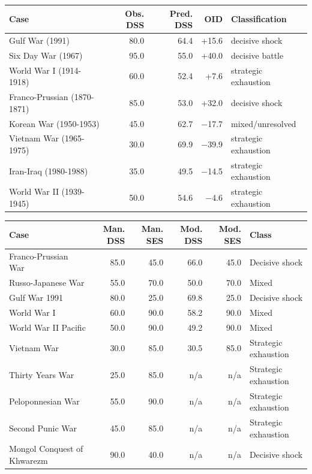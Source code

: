 \begin{table}[p]
\centering
{}
\label{tab:case_inventory_oid}
\small
\begin{tabularx}{\textwidth}{@{}>{\RaggedRight\arraybackslash}p{} r r r >{\RaggedRight\arraybackslash}X@{}}
\toprule
\textbf{Case} & \textbf{Obs. DSS} & \textbf{Pred. DSS} & \textbf{OID} & \textbf{Classification} \\
\midrule
Gulf War (1991) & 80.0 & 64.4 & +15.6 & decisive shock \\
Six Day War (1967) & 95.0 & 55.0 & +40.0 & decisive battle \\
World War I (1914-1918) & 60.0 & 52.4 & +7.6 & strategic exhaustion \\
Franco-Prussian (1870-1871) & 85.0 & 53.0 & +32.0 & decisive shock \\
Korean War (1950-1953) & 45.0 & 62.7 & $-$17.7 & mixed/unresolved \\
Vietnam War (1965-1975) & 30.0 & 69.9 & $-$39.9 & strategic exhaustion \\
Iran-Iraq (1980-1988) & 35.0 & 49.5 & $-$14.5 & strategic exhaustion \\
World War II (1939-1945) & 50.0 & 54.6 & $-$4.6 & strategic exhaustion \\
\bottomrule
\end{tabularx}
\vspace{1.5\baselineskip}

\label{tab:manual_case_inventory}
\scriptsize
\setlength{\tabcolsep}{3pt}
\renewcommand{\arraystretch}{1.08}
\begin{tabularx}{\textwidth}{@{}>{\RaggedRight\arraybackslash}p{} r r r r >{\RaggedRight\arraybackslash}p{}@{}}
\toprule
\textbf{Case} & \textbf{Man. DSS} & \textbf{Man. SES} & \textbf{Mod. DSS} & \textbf{Mod. SES} & \textbf{Class} \\
\midrule
Franco-Prussian War & 85.0 & 45.0 & 66.0 & 45.0 & Decisive shock \\
Russo-Japanese War & 55.0 & 70.0 & 50.0 & 70.0 & Mixed \\
Gulf War 1991 & 80.0 & 25.0 & 69.8 & 25.0 & Decisive shock \\
World War I & 60.0 & 90.0 & 58.2 & 90.0 & Mixed \\
World War II Pacific & 50.0 & 90.0 & 49.2 & 90.0 & Mixed \\
Vietnam War & 30.0 & 85.0 & 30.5 & 85.0 & Strategic exhaustion \\
Thirty Years War & 25.0 & 85.0 & n/a & n/a & Strategic exhaustion \\
Peloponnesian War & 55.0 & 90.0 & n/a & n/a & Strategic exhaustion \\
Second Punic War & 45.0 & 85.0 & n/a & n/a & Strategic exhaustion \\
Mongol Conquest of Khwarezm & 90.0 & 40.0 & n/a & n/a & Decisive shock \\
\bottomrule
\end{tabularx}
\end{table}
